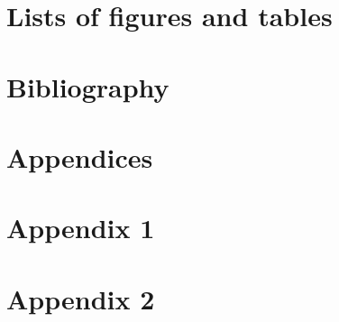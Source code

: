 \documentclass{article}
\begin{document}
 \section{Lists of figures and tables}
 
 \newpage
 \listoffigures
 \listoftables
 
 \section{Bibliography} %
 
 \newpage
 
 {}
 
 
 \newpage
 \section{Appendices}
 \begin{appendices}
  \section*{Appendix 1}
  \section*{Appendix 2}
 \end{appendices}
 
 
\end{document}
